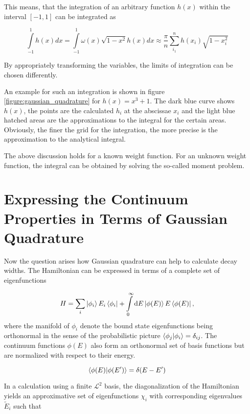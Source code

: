 This means, that the integration of an arbitrary function $h(x)$ within
the interval $[-1,1]$ can be integrated as

\begin{equation}
  \int\limits_{-1}^1 h(x) dx = \int\limits_{-1}^1 \omega(x) \sqrt{1-x^2} h(x) dx
  \approx \frac \pi n \sum\limits_{i_1}^n h(x_i) \sqrt{1-x_i^2}
\end{equation}

By appropriately transforming the variables, the limits of integration can be
chosen differently.

An example for such an integration is shown in figure \ref{figure:gaussian_quadrature}
for $h(x) = x^3 + 1$. The dark blue curve shows $h(x)$, the points are the
calculated $h_i$ at the abscissae $x_i$ and the light blue hatched areas are the
approximations to the integral for the certain areas. Obviously, the finer the
grid for the integration, the more precise is the approximation to
the analytical integral.

The above discussion holds for a known weight function.
For an unknown weight function, the integral can be obtained by solving the so-called
moment problem. \cite{Reinhardt79}




\section{Expressing the Continuum Properties in Terms of Gaussian Quadrature}
Now the question arises how Gaussian quadrature can help to calculate
decay widths.
The Hamiltonian can be expressed in terms of a complete set of eigenfunctions

\begin{equation} \label{equation:complete_hamniltonian}
  H = \sum\limits_i \ket{\phi_i} E_i \bra{\phi_i}
     + \int\limits_0^\infty \mathrm{d}E \ket{\phi(E)} E \bra{\phi(E)}  ,
\end{equation}
where the manifold of $\phi_i$ denote the bound state eigenfunctions being orthonormal
in the sense of the probabilistic picture $\braket{\phi_j|\phi_i} = \delta_{ij}$.
The continuum functions $\phi(E)$ also form an orthonormal set of basis functions
but are normalized with respect to their energy.

\begin{equation}
  \braket{\phi(E) | \phi(E')} = \delta(E-E')
\end{equation}

In a calculation using a finite $\mathcal{L}^2$ basis, the diagonalization of the
Hamiltonian yields an approximative set of eigenfunctions $\chi_i$ with corresponding
eigenvalues $\tilde{E}_i$ such that

